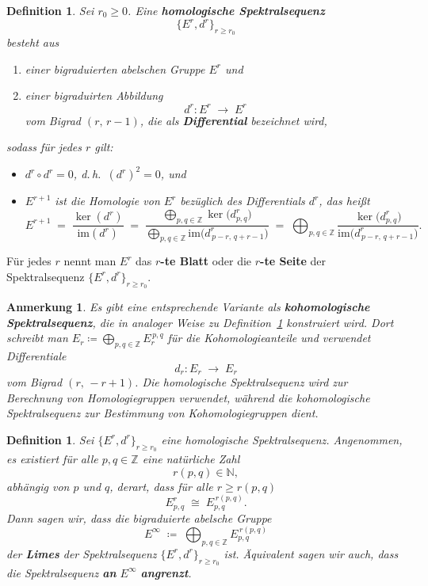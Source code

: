 \documentclass[12pt]{article}
\numberwithin{conj}{section}
\newtheorem{definition}[conj]{Definition}
\newtheorem{remark}[conj]{Anmerkung}
\newcommand{\Z}{\mathbb{Z}}
\begin{document}
\begin{definition}
    \label{homologischeSpektraleSequenz}
    Sei $r_0 \geq 0$. Eine \textbf{homologische Spektralsequenz} 
    \[
        \{E^r,d^r\}_{r \geq r_0}
    \]
    besteht aus
    \begin{enumerate}[nolistsep]
        \item einer bigraduierten abelschen Gruppe $E^r$ und
        \item einer bigraduirten Abbildung
              \[
                d^r : E^r \;\longrightarrow\; E^r
              \]
              vom Bigrad $(r,\,r-1)$, die als \textbf{Differential} bezeichnet wird,
    \end{enumerate}
    sodass für jedes $r$ gilt:
    \begin{itemize}[nolistsep]
        \item $d^r \circ d^r = 0$, d.\,h.\ $(d^r)^2 = 0$, und
        \item $E^{r+1}$ ist die Homologie von $E^r$ bezüglich des Differentials $d^r$, das heißt
              \[
                E^{r+1}
                \;=\;
                \frac{\ker(d^r)}{\mathrm{im}(d^r)}
                \;=\;
                \frac{\displaystyle\bigoplus_{p,q \in \Z} \ker\bigl(d^r_{p,q}\bigr)}%
                {\displaystyle\bigoplus_{p,q \in \Z} \mathrm{im}\!\bigl(d^r_{\,p-r,\,q+r-1}\bigr)}
                \;=\;
                \bigoplus_{p,q \in \Z}
                \frac{\ker\bigl(d^r_{p,q}\bigr)}{\mathrm{im}\!\bigl(d^r_{\,p-r,\,q+r-1}\bigr)}.
              \]
    \end{itemize}
\end{definition}

Für jedes $r$ nennt man $E^r$ das \textbf{$r$-te Blatt} oder die \textbf{$r$-te Seite} der Spektralsequenz $\{E^r,d^r\}_{r \geq r_0}$.

\begin{remark}
    Es gibt eine entsprechende Variante als \textbf{kohomologische Spektralsequenz}, die in analoger Weise zu Definition~\ref{homologischeSpektraleSequenz} konstruiert wird. 
    Dort schreibt man $E_r \coloneqq \bigoplus_{p,q \in \Z} E_{r}^{\,p,q}$ für die Kohomologieanteile und verwendet Differentiale
    \[
        d_r : E_r \;\longrightarrow\; E_r
    \]
    vom Bigrad $(r,\,-r+1)$. Die homologische Spektralsequenz wird zur Berechnung von Homologiegruppen verwendet, während die kohomologische Spektralsequenz zur Bestimmung von Kohomologiegruppen dient.
\end{remark}

\begin{definition}
    Sei $\{E^r, d^r\}_{r \geq r_0}$ eine homologische Spektralsequenz. Angenommen, es existiert für alle $p,q \in \Z$ eine natürliche Zahl
    \[
        r(p,q) \in \mathbb{N},
    \]
    abhängig von $p$ und $q$, derart, dass für alle $r \ge r(p,q)$
    \[
        E^r_{p,q} \;\cong\; E_{p,q}^{\,r(p,q)}.
    \]
    Dann sagen wir, dass die bigraduierte abelsche Gruppe
    \[
        E^\infty \;\coloneqq\; \bigoplus_{p,q \in \Z} E_{p,q}^{\,r(p,q)}
    \]
    der \textbf{Limes} der Spektralsequenz $\{E^r, d^r\}_{r \geq r_0}$ ist. Äquivalent sagen wir auch, dass die Spektralsequenz \textbf{an} $E^\infty$ \textbf{angrenzt}.
\end{definition}
\end{document}
